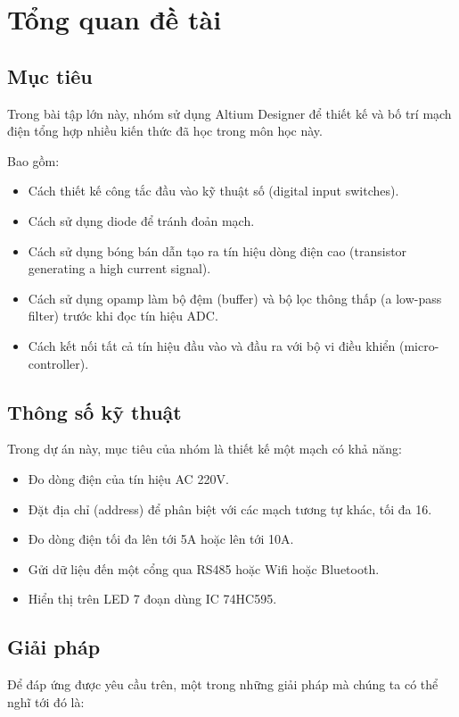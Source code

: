 \section{Tổng quan đề tài}
\subsection{Mục tiêu}
Trong bài tập lớn này, nhóm sử dụng Altium Designer để thiết kế và bố trí mạch điện
tổng hợp nhiều kiến thức đã học trong môn học này.

Bao gồm:

\begin{itemize}
    \item Cách thiết kế công tắc đầu vào kỹ thuật số (digital input switches).
    \item Cách sử dụng diode để tránh đoản mạch.
    \item Cách sử dụng bóng bán dẫn tạo ra tín hiệu dòng điện cao (transistor generating a high current signal).
    \item Cách sử dụng opamp làm bộ đệm (buffer) và bộ lọc thông thấp (a low-pass filter) trước khi đọc tín hiệu ADC.
    \item Cách kết nối tất cả tín hiệu đầu vào và đầu ra với bộ vi điều khiển (micro-controller).
\end{itemize}

\subsection{Thông số kỹ thuật}
Trong dự án này, mục tiêu của nhóm là thiết kế một mạch có khả năng:

\begin{itemize}
    \item Đo dòng điện của tín hiệu AC 220V.
    \item Đặt địa chỉ (address) để phân biệt với các mạch tương tự khác, tối đa 16.
    \item Đo dòng điện tối đa lên tới 5A hoặc lên tới 10A.
    \item Gửi dữ liệu đến một cổng qua RS485 hoặc Wifi hoặc Bluetooth.
    \item Hiển thị trên LED 7 đoạn dùng IC 74HC595.
\end{itemize}

\subsection{Giải pháp}
Để đáp ứng được yêu cầu trên, một trong những giải pháp mà chúng ta có thể nghĩ tới đó là:

